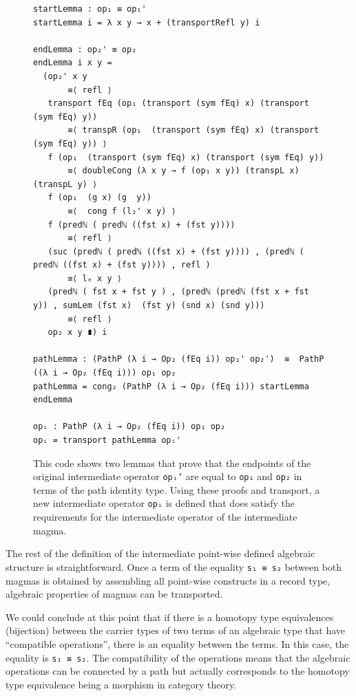 \documentclass[12pt,a4paper,twoside,xetex,draft]{book}
\begin{document}
\begin{figure}\label{adaptedOp}
 \centering
\begin{BVerbatim}
startLemma : op₁ ≡ op₁'
startLemma i = λ x y → x + (transportRefl y) i

endLemma : op₂' ≡ op₂
endLemma i x y =
  (op₂' x y
       ≡⟨ refl ⟩
   transport fEq (op₁ (transport (sym fEq) x) (transport (sym fEq) y))
       ≡⟨ transpR (op₁  (transport (sym fEq) x) (transport (sym fEq) y)) ⟩
   f (op₁  (transport (sym fEq) x) (transport (sym fEq) y))
       ≡⟨ doubleCong (λ x y → f (op₁ x y)) (transpL x) (transpL y) ⟩
   f (op₁  (g x) (g  y))
       ≡⟨  cong f (l₂' x y) ⟩
   f (predℕ ( predℕ ((fst x) + (fst y))))
       ≡⟨ refl ⟩
   (suc (predℕ ( predℕ ((fst x) + (fst y)))) , (predℕ ( predℕ ((fst x) + (fst y)))) , refl )
       ≡⟨ lₑ x y ⟩
   (predℕ ( fst x + fst y ) , (predℕ (predℕ (fst x + fst y)) , sumLem (fst x)  (fst y) (snd x) (snd y)))
       ≡⟨ refl ⟩
   op₂ x y ∎) i

pathLemma : (PathP (λ i → Op₂ (fEq i)) op₁' op₂')  ≡  PathP ((λ i → Op₂ (fEq i))) op₁ op₂
pathLemma = cong₂ (PathP (λ i → Op₂ (fEq i))) startLemma endLemma

opᵢ : PathP (λ i → Op₂ (fEq i)) op₁ op₂
opᵢ = transport pathLemma opᵢ'
\end{BVerbatim}

\caption{This code shows two lemmas that prove that the endpoints of the original intermediate operator \texttt{opᵢ'} are equal to \texttt{op₁} and \texttt{op₂} in terms of the path identity type. Using these proofs and transport, a new intermediate operator \texttt{opᵢ} is defined that does satisfy the requirements for the intermediate operator of the intermediate magma.}   
\end{figure}

The rest of the definition of the intermediate point-wise defined algebraic structure is straightforward. Once a term of the equality \texttt{s₁ ≡ s₂} between both magmas is obtained by assembling all point-wise constructs in a record type, algebraic properties of magmas can be transported. 


We could conclude at this point that if there is a homotopy type equivalences (bijection) between the carrier types of two terms of an algebraic type that have ``compatible operations'', there is an equality between the terms. In this case, the equality is \texttt{s₁ ≡ s₂}. The compatibility of the operations means that the algebraic operations can be connected by a path but actually corresponds to the homotopy type equivalence being a morphism in category theory.
\end{document}
